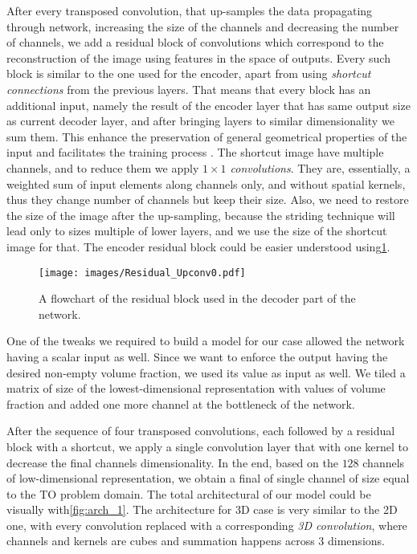 After every transposed convolution, that up-samples the data propagating through network, increasing the size of the channels and decreasing the number of channels, we add a residual block of convolutions which correspond to the reconstruction of the image using features in the space of outputs.
Every such block is similar to the one used for the encoder, apart from using \textit{shortcut connections} from the previous layers.
That means that every block has an additional input, namely the result of the encoder layer that has same output size as current decoder layer, and after bringing layers to similar dimensionality we sum them.
This enhance the preservation of general geometrical properties of the input and facilitates the training process \cite{bibl:shortcuts}.
The shortcut image have multiple channels, and to reduce them we apply \textit{$1\times 1$ convolutions}.
They are, essentially, a weighted sum of input elements along channels only, and without spatial kernels, thus they change number of channels but keep their size. 
Also, we need to restore the size of the image after the up-sampling, because the striding technique will lead only to sizes multiple of lower layers, and we use the size of the shortcut image for that.
The encoder residual block could be easier understood using\ref{fig:res_block_upc}.

\medskip
\begin{figure}
	\centering
	\texttt{[image: images/Residual\_Upconv0.pdf]}
	\label{fig:res_block_upc}
	\caption{A flowchart of the residual block used in the decoder part of the network.}
\end{figure}

One of the tweaks we required to build a model for our case allowed the network having a scalar input as well.
Since we want to enforce the output having the desired non-empty volume fraction, we used its value as input as well.
We tiled a matrix of size of the lowest-dimensional representation with values of volume fraction and added one more channel at the bottleneck of the network. 
\medskip

After the sequence of four transposed convolutions, each followed by a residual block with a shortcut, we apply a single convolution layer that with one kernel to decrease the final channels dimensionality. 
In the end, based on the $128$ channels of low-dimensional representation, we obtain a final of single channel of size equal to the TO problem domain.
The total architectural of our model could be visually with\ref{fig:arch_1}.
The architecture for 3D case is very similar to the 2D one, with every convolution replaced with a corresponding \textit{3D convolution}, where channels and kernels are cubes and summation happens across $3$ dimensions.

